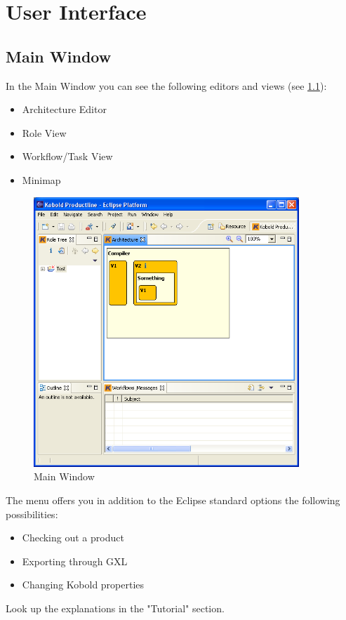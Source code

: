 \chapter{User Interface}

\section{Main Window}
In the Main Window you can see the following editors and views (see \ref{main}):
\begin{itemize}
	\item Architecture Editor
	\item Role View
	\item Workflow/Task View
	\item Minimap
\end{itemize}

\begin{figure}[h!]
\begin{center}
\includegraphics[width=10cm]{main.png}
   \caption{Main Window}
\label{main}
\end{center}
\end{figure}\par

The menu offers you in addition to the Eclipse standard options the following
possibilities:
\begin{itemize}
	\item Checking out a product
	\item Exporting through GXL
	\item Changing Kobold properties
\end{itemize}
Look up the explanations in the "Tutorial" section.

